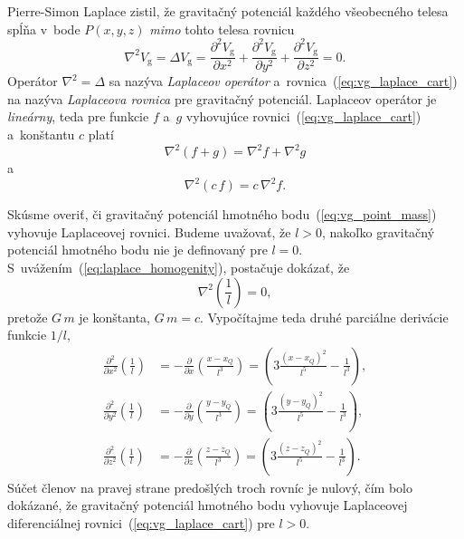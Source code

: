 \documentclass[a4paper, 12pt]{book}
\newcommand{\gidx}{\mathrm g}
\begin{document}
Pierre-Simon Laplace zistil, že gravitačný potenciál každého všeobecného telesa
spĺňa v~bode $P(x, y, z)$ \emph{mimo} tohto telesa rovnicu
%
\begin{equation}
\label{eq:vg_laplace_cart}
\nabla^2 V_\gidx = \Delta V_\gidx = \frac{\partial^2 V_\gidx}{\partial x^2}
+ \frac{\partial^2 V_\gidx}{\partial y^2} + \frac{\partial^2 V_\gidx}{\partial
z^2} = 0{.}
\end{equation}
%
Operátor $\nabla^2 = \Delta$ sa nazýva \emph{Laplaceov operátor}
a~rovnica~(\ref{eq:vg_laplace_cart}) na nazýva \emph{Laplaceova rovnica} pre
gravitačný potenciál.  Laplaceov operátor je \emph{lineárny}, teda pre funkcie
$f$ a~$g$ vyhovujúce rovnici~(\ref{eq:vg_laplace_cart}) a~konštantu $c$ platí
%
\begin{equation}
\label{eq:laplace_additivity}
\nabla^2 \left(f + g \right) = \nabla^2 f + \nabla^2 g
\end{equation}
%
a
%
\begin{equation}
\label{eq:laplace_homogenity}
\nabla^2 (c \, f) = c \, \nabla^2 f{.}
\end{equation}

Skúsme overiť, či gravitačný potenciál hmotného bodu~(\ref{eq:vg_point_mass})
vyhovuje Laplaceovej rovnici.  Budeme uvažovať, že $l > 0$, nakoľko gravitačný
potenciál hmotného bodu nie je definovaný pre $l = 0$.
S~uvážením~(\ref{eq:laplace_homogenity}), postačuje dokázať, že
%
\begin{equation}
\label{eq:nabla_l}
\nabla^2 \left( \frac{1}{l} \right) = 0{,}
\end{equation}
%
pretože $G \, m$ je konštanta, $G \, m = c$.  Vypočítajme teda druhé parciálne
derivácie funkcie $1 \slash l$,
%
\begin{equation}
\label{eq:l_2nd_derivatives}
\begin{split}
\frac{\partial^2}{\partial x^2} \left( \frac{1}{l} \right) &=
-\frac{\partial}{\partial x} \left( \frac{x - x_Q}{l^3} \right) = \left(3
\frac{(x - x_Q)^2}{l^5} - \frac{1}{l^3} \right){,}\\
%
\frac{\partial^2}{\partial y^2} \left( \frac{1}{l} \right) &=
-\frac{\partial}{\partial y} \left( \frac{y - y_Q}{l^3} \right) = \left(3
\frac{(y - y_Q)^2}{l^5} - \frac{1}{l^3} \right){,}\\
%
\frac{\partial^2}{\partial z^2} \left( \frac{1}{l} \right) &=
-\frac{\partial}{\partial z} \left( \frac{z - z_Q}{l^3} \right) = \left(3
\frac{(z - z_Q)^2}{l^5} - \frac{1}{l^3} \right){.}
\end{split}
\end{equation}
%
Súčet členov na pravej strane predošlých troch rovníc je nulový, čím bolo
dokázané, že gravitačný potenciál hmotného bodu vyhovuje Laplaceovej
diferenciálnej rovnici~(\ref{eq:vg_laplace_cart}) pre $l > 0$.
\end{document}
